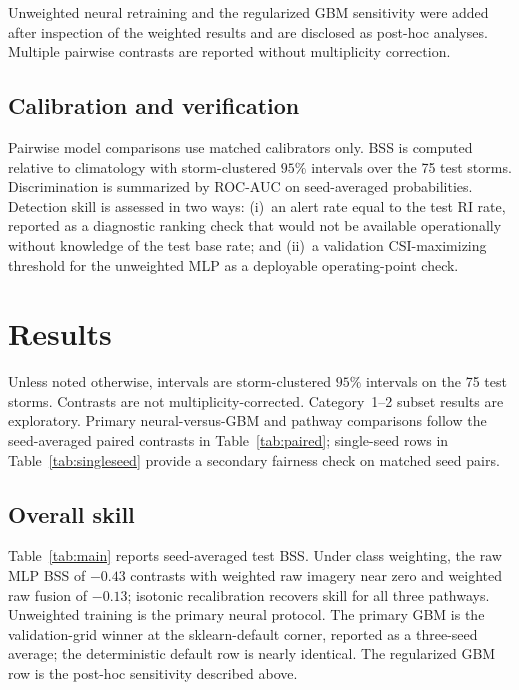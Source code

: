 \documentclass[11pt]{article}
\begin{document}
Unweighted neural retraining and the regularized GBM sensitivity were added after inspection of the weighted results and are disclosed as post-hoc analyses. Multiple pairwise contrasts are reported without multiplicity correction.

\subsection{Calibration and verification}

Pairwise model comparisons use matched calibrators only. BSS is computed relative to climatology with storm-clustered $95\%$ intervals over the 75 test storms. Discrimination is summarized by ROC-AUC on seed-averaged probabilities. Detection skill is assessed in two ways: (i)~an alert rate equal to the test RI rate, reported as a diagnostic ranking check that would not be available operationally without knowledge of the test base rate; and (ii)~a validation CSI-maximizing threshold for the unweighted MLP as a deployable operating-point check.

\section{Results}
\label{sec:results}

Unless noted otherwise, intervals are storm-clustered $95\%$ intervals on the 75 test storms. Contrasts are not multiplicity-corrected. Category~1--2 subset results are exploratory. Primary neural-versus-GBM and pathway comparisons follow the seed-averaged paired contrasts in Table~\ref{tab:paired}; single-seed rows in Table~\ref{tab:singleseed} provide a secondary fairness check on matched seed pairs.

\subsection{Overall skill}

Table~\ref{tab:main} reports seed-averaged test BSS. Under class weighting, the raw MLP BSS of $-0.43$ contrasts with weighted raw imagery near zero and weighted raw fusion of $-0.13$; isotonic recalibration recovers skill for all three pathways. Unweighted training is the primary neural protocol. The primary GBM is the validation-grid winner at the sklearn-default corner, reported as a three-seed average; the deterministic default row is nearly identical. The regularized GBM row is the post-hoc sensitivity described above.
\end{document}

